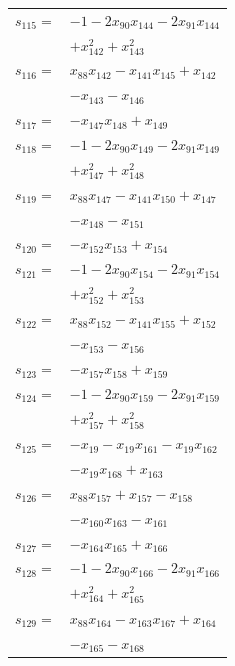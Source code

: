 \begin{longtable}{@{}r@{\;}l@{}}
\(s_{115}=\) & \(\displaystyle -1 -2x_{90}x_{144} -2x_{91}x_{144}\) \\
 & \(\displaystyle +x_{142}^{2} +x_{143}^{2}\) \\[3pt]
\(s_{116}=\) & \(\displaystyle x_{88}x_{142} -x_{141}x_{145} +x_{142}\) \\
 & \(\displaystyle -x_{143} -x_{146}\) \\[3pt]
\(s_{117}=\) & \(\displaystyle -x_{147}x_{148} +x_{149}\) \\[3pt]
\(s_{118}=\) & \(\displaystyle -1 -2x_{90}x_{149} -2x_{91}x_{149}\) \\
 & \(\displaystyle +x_{147}^{2} +x_{148}^{2}\) \\[3pt]
\(s_{119}=\) & \(\displaystyle x_{88}x_{147} -x_{141}x_{150} +x_{147}\) \\
 & \(\displaystyle -x_{148} -x_{151}\) \\[3pt]
\(s_{120}=\) & \(\displaystyle -x_{152}x_{153} +x_{154}\) \\[3pt]
\(s_{121}=\) & \(\displaystyle -1 -2x_{90}x_{154} -2x_{91}x_{154}\) \\
 & \(\displaystyle +x_{152}^{2} +x_{153}^{2}\) \\[3pt]
\(s_{122}=\) & \(\displaystyle x_{88}x_{152} -x_{141}x_{155} +x_{152}\) \\
 & \(\displaystyle -x_{153} -x_{156}\) \\[3pt]
\(s_{123}=\) & \(\displaystyle -x_{157}x_{158} +x_{159}\) \\[3pt]
\(s_{124}=\) & \(\displaystyle -1 -2x_{90}x_{159} -2x_{91}x_{159}\) \\
 & \(\displaystyle +x_{157}^{2} +x_{158}^{2}\) \\[3pt]
\(s_{125}=\) & \(\displaystyle -x_{19} -x_{19}x_{161} -x_{19}x_{162}\) \\
 & \(\displaystyle -x_{19}x_{168} +x_{163}\) \\[3pt]
\(s_{126}=\) & \(\displaystyle x_{88}x_{157} +x_{157} -x_{158}\) \\
 & \(\displaystyle -x_{160}x_{163} -x_{161}\) \\[3pt]
\(s_{127}=\) & \(\displaystyle -x_{164}x_{165} +x_{166}\) \\[3pt]
\(s_{128}=\) & \(\displaystyle -1 -2x_{90}x_{166} -2x_{91}x_{166}\) \\
 & \(\displaystyle +x_{164}^{2} +x_{165}^{2}\) \\[3pt]
\(s_{129}=\) & \(\displaystyle x_{88}x_{164} -x_{163}x_{167} +x_{164}\) \\
 & \(\displaystyle -x_{165} -x_{168}\) \\[3pt]

\end{longtable}
